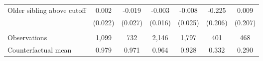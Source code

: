 {{\begin{tabular}{lcccccc}
Older sibling above cutoff&       0.002   &      -0.019   &      -0.003   &      -0.008   &      -0.225   &       0.009   \\
                    &     (0.022)   &     (0.027)   &     (0.016)   &     (0.025)   &     (0.206)   &     (0.207)   \\
                    &               &               &               &               &               &               \\
Observations        &       1,099   &         732   &       2,146   &       1,797   &         401   &         468   \\
Counterfactual mean &       0.979   &       0.971   &       0.964   &       0.928   &       0.332   &       0.290   \\
 

\bottomrule
\end{tabular}
}
}

